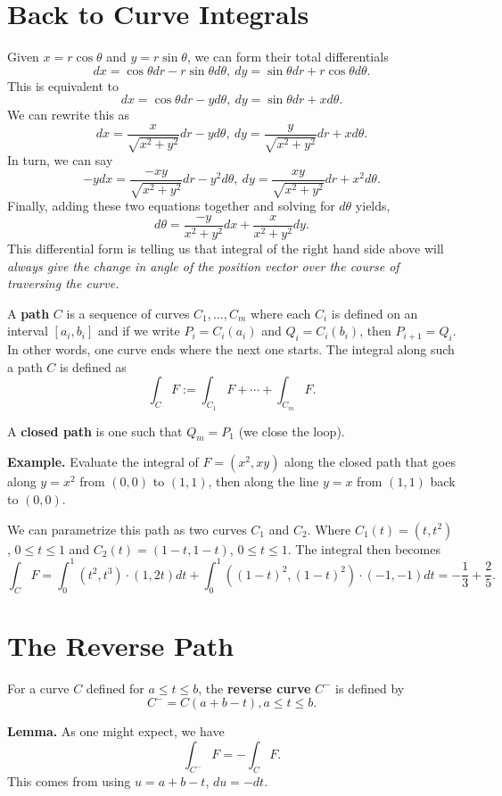 \documentclass{article}
\begin{document}
\section*{Back to Curve Integrals}
Given $x = r\cos\theta$ and $y = r\sin\theta$, we can form their total differentials
\[dx = \cos\theta dr - r \sin\theta d\theta,\ dy = \sin\theta dr + r\cos\theta d\theta.\]
This is equivalent to 
\[dx = \cos\theta dr - yd\theta,\ dy = \sin\theta dr + x d\theta.\]
We can rewrite this as 
\[dx = \frac{x}{\sqrt{x^2+y^2}}dr - yd\theta,\ dy = \frac{y}{\sqrt{x^2+y^2}}dr + x d\theta.\]
In turn, we can say
\[-ydx = \frac{-xy}{\sqrt{x^2+y^2}}dr - y^2d\theta,\ dy = \frac{xy}{\sqrt{x^2+y^2}}dr + x^2 d\theta.\]
Finally, adding these two equations together and solving for $d\theta$ yields,
\[d\theta = \frac{-y}{x^2+y^2}dx + \frac{x}{x^2+y^2}dy. \]
This differential form is telling us that integral of the right hand side above will \emph{always give the change in angle
of the position vector over the course of traversing the curve.}

A \textbf{path} $C$ is a sequence of curves $C_1, \ldots, C_m$ where each $C_i$ is defined on an interval
$[a_i,b_i]$ and if we write $P_i = C_i(a_i)$ and $Q_i = C_i(b_i)$, then $P_{i+1}=Q_i$. In other words, one curve
ends where the next one starts. The integral along such a path $C$ is defined as 
\[\int_C F := \int_{C_1} F + \cdots + \int_{C_m} F.\]

A \textbf{closed path} is one such that $Q_m = P_1$ (we close the loop).

\textbf{Example.} Evaluate the integral of $F = (x^2,xy)$ along the closed path that goes along $y=x^2$ from
$(0,0)$ to $(1,1)$, then along the line $y=x$ from $(1,1)$ back to $(0,0)$. 

We can parametrize this path as two curves $C_1$ and $C_2$. Where $C_1(t) = (t,t^2)$, $0 \leq t \leq 1$
and $C_2(t) = (1-t, 1-t)$, $0 \leq t \leq 1$. The integral then becomes
\[\int_C F = \int_{0}^1 (t^2, t^3)\cdot(1, 2t)dt + \int_0^1 ((1-t)^2, (1-t)^2)\cdot(-1,-1)dt = -\frac{1}{3} + \frac{2}{5}.\]

\section*{The Reverse Path}

For a curve $C$ defined for $a\leq t \leq b$, the \textbf{reverse curve} $C^-$ is defined by 
\[C^- = C(a+b-t), a \leq t \leq b.\]

\textbf{Lemma.} As one might expect, we have 
\[\int_{C^-} F = - \int_C F. \]
This comes from using $u = a + b - t$, $du = -dt$.
\end{document}

